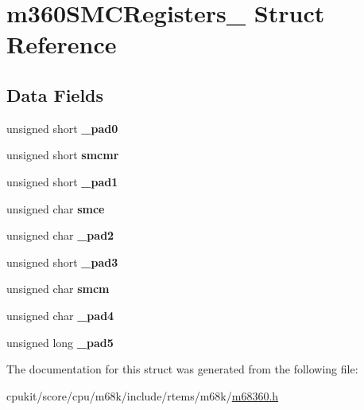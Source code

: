 \hypertarget{structm360SMCRegisters__}{}\section{m360\+S\+M\+C\+Registers\+\_\+ Struct Reference}
\label{structm360SMCRegisters__}
\subsection*{Data Fields}
\begin{DoxyCompactItemize}
\item 
\mbox{\label{structm360SMCRegisters___acefa6d047f023c22076418ca539a39ff}} 
unsigned short {\bfseries \+\_\+pad0}
\item 
\mbox{\label{structm360SMCRegisters___afd5dd28aa7fdad91dd226ad42d825b6c}} 
unsigned short {\bfseries smcmr}
\item 
\mbox{\label{structm360SMCRegisters___a673a2f0aa9485fe0175789f76fde9048}} 
unsigned short {\bfseries \+\_\+pad1}
\item 
\mbox{\label{structm360SMCRegisters___a5da5bfd6378cfd5b203f0c85f82e8d9d}} 
unsigned char {\bfseries smce}
\item 
\mbox{\label{structm360SMCRegisters___a4399dccc25073527122fe32c240899f4}} 
unsigned char {\bfseries \+\_\+pad2}
\item 
\mbox{\label{structm360SMCRegisters___aee81c20afd987831beffd92b2b008096}} 
unsigned short {\bfseries \+\_\+pad3}
\item 
\mbox{\label{structm360SMCRegisters___a2622bb7e840499e079a84c1eb563e012}} 
unsigned char {\bfseries smcm}
\item 
\mbox{\label{structm360SMCRegisters___a9854700787bde890c61317c54842cd04}} 
unsigned char {\bfseries \+\_\+pad4}
\item 
\mbox{\label{structm360SMCRegisters___a93d16d4d414bba597cce347386d16498}} 
unsigned long {\bfseries \+\_\+pad5}
\end{DoxyCompactItemize}


The documentation for this struct was generated from the following file\+:\begin{DoxyCompactItemize}
\item 
cpukit/score/cpu/m68k/include/rtems/m68k/\mbox{\hyperlink{m68360_8h}{m68360.\+h}}\end{DoxyCompactItemize}
